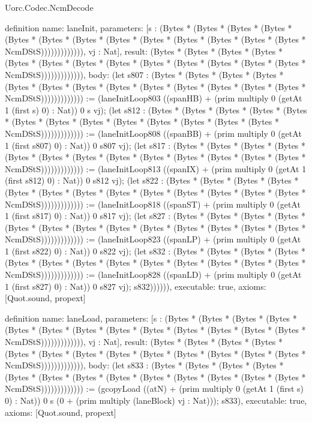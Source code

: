 \begin{lexlean}{Uorc.Codec.NcmDecode}
\begin{semanticmodule}
definition{
  name: laneInit,
  parameters: [s : (Bytes * (Bytes * (Bytes * (Bytes * (Bytes * (Bytes * (Bytes * (Bytes * (Bytes * (Bytes * (Bytes * (Bytes * (Bytes * NcmDStS))))))))))))), vj : Nat],
  result: (Bytes * (Bytes * (Bytes * (Bytes * (Bytes * (Bytes * (Bytes * (Bytes * (Bytes * (Bytes * (Bytes * (Bytes * (Bytes * NcmDStS))))))))))))),
  body: (let s807 : (Bytes * (Bytes * (Bytes * (Bytes * (Bytes * (Bytes * (Bytes * (Bytes * (Bytes * (Bytes * (Bytes * (Bytes * (Bytes * NcmDStS))))))))))))) := (laneInitLoop803 ((spanHB) + (prim multiply 0 (getAt 1 (first s) 0) : Nat)) 0 s vj); (let s812 : (Bytes * (Bytes * (Bytes * (Bytes * (Bytes * (Bytes * (Bytes * (Bytes * (Bytes * (Bytes * (Bytes * (Bytes * (Bytes * NcmDStS))))))))))))) := (laneInitLoop808 ((spanBB) + (prim multiply 0 (getAt 1 (first s807) 0) : Nat)) 0 s807 vj); (let s817 : (Bytes * (Bytes * (Bytes * (Bytes * (Bytes * (Bytes * (Bytes * (Bytes * (Bytes * (Bytes * (Bytes * (Bytes * (Bytes * NcmDStS))))))))))))) := (laneInitLoop813 ((spanIX) + (prim multiply 0 (getAt 1 (first s812) 0) : Nat)) 0 s812 vj); (let s822 : (Bytes * (Bytes * (Bytes * (Bytes * (Bytes * (Bytes * (Bytes * (Bytes * (Bytes * (Bytes * (Bytes * (Bytes * (Bytes * NcmDStS))))))))))))) := (laneInitLoop818 ((spanST) + (prim multiply 0 (getAt 1 (first s817) 0) : Nat)) 0 s817 vj); (let s827 : (Bytes * (Bytes * (Bytes * (Bytes * (Bytes * (Bytes * (Bytes * (Bytes * (Bytes * (Bytes * (Bytes * (Bytes * (Bytes * NcmDStS))))))))))))) := (laneInitLoop823 ((spanLP) + (prim multiply 0 (getAt 1 (first s822) 0) : Nat)) 0 s822 vj); (let s832 : (Bytes * (Bytes * (Bytes * (Bytes * (Bytes * (Bytes * (Bytes * (Bytes * (Bytes * (Bytes * (Bytes * (Bytes * (Bytes * NcmDStS))))))))))))) := (laneInitLoop828 ((spanLD) + (prim multiply 0 (getAt 1 (first s827) 0) : Nat)) 0 s827 vj); s832)))))),
  executable: true,
  axioms: [Quot.sound, propext]
}

definition{
  name: laneLoad,
  parameters: [s : (Bytes * (Bytes * (Bytes * (Bytes * (Bytes * (Bytes * (Bytes * (Bytes * (Bytes * (Bytes * (Bytes * (Bytes * (Bytes * NcmDStS))))))))))))), vj : Nat],
  result: (Bytes * (Bytes * (Bytes * (Bytes * (Bytes * (Bytes * (Bytes * (Bytes * (Bytes * (Bytes * (Bytes * (Bytes * (Bytes * NcmDStS))))))))))))),
  body: (let s833 : (Bytes * (Bytes * (Bytes * (Bytes * (Bytes * (Bytes * (Bytes * (Bytes * (Bytes * (Bytes * (Bytes * (Bytes * (Bytes * NcmDStS))))))))))))) := (gcopyLoad ((atN) + (prim multiply 0 (getAt 1 (first s) 0) : Nat)) 0 s (0 + (prim multiply (laneBlock) vj : Nat))); s833),
  executable: true,
  axioms: [Quot.sound, propext]
}


\end{semanticmodule}
\end{lexlean}
